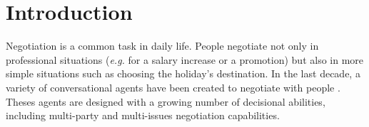 \documentclass[sigconf]{aamas}  %
\begin{document}
	
	\begin{abstract}  %
		
	
		
	\end{abstract}
	
	
	
	
	
	\maketitle
	
	
	
	\section{Introduction}
	Negotiation is a common task in daily life. People negotiate not only in professional situations (\emph{e.g.} for a salary increase or a promotion) but also in more simple situations such as choosing the holiday's destination. In the last decade, a variety of conversational agents have been created to negotiate with people \cite{pynadath2013you,gratch2016misrepresentation,klatt2011negotiations}. Theses agents are designed with a growing number of decisional abilities, including multi-party and multi-issues negotiation capabilities.
	
\end{document}

